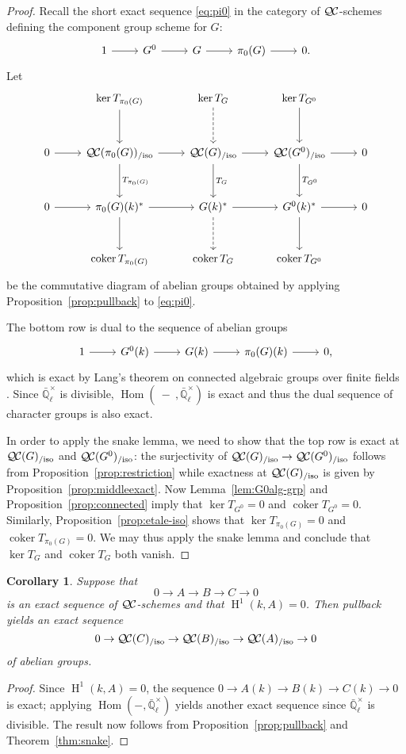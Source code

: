 \documentclass{amsart}
\theoremstyle{plain}
\newtheorem{corollary}[theorem]{Corollary}
\theoremstyle{definition}
\theoremstyle{remark}
\newcommand{\EE}{\mathbb{\bar Q}_\ell}
\newcommand{\Fq}{k}
\newcommand{\EEx}{\EE^\times}
\DeclareMathOperator{\Hom}{Hom}
\DeclareMathOperator{\coker}{coker}
\DeclareMathOperator{\Hh}{H}
\newcommand{\QC}{{\mathcal{Q\hskip-0.8pt C}}}
\newcommand{\QCiso}[1]{\QC(#1)_{/\text{iso}}}
\newcommand{\TrFrob}[1]{T_{#1}}
\begin{document}
\begin{proof}
  Recall the short exact sequence \eqref{eq:pi0} in the category of $\QC$-schemes
  defining the component group scheme for $G$:
  \[
  \begin{tikzcd}
    1 \rar & G^0 \rar & G \rar & \pi_0(G) \rar & 0.
  \end{tikzcd}
  \]
  Let
  \[
  \begin{tikzcd}[row sep=30]
    {}& \ker \TrFrob{\pi_0(G)} \dar & \arrow[dashed]{d} \ker \TrFrob{G} & \ker \TrFrob{G^0} \dar & \\
    0 \rar & \QCiso{\pi_0(G)} \rar \dar{\TrFrob{\pi_0(G)}}
    & \QCiso{G} \rar \dar{\TrFrob{G}} & \QCiso{G^0} \rar \dar{\TrFrob{G^0}} & 0\\
    0 \rar & \pi_0(G)(\Fq)^* \rar \dar
    & \arrow[dashed]{d} G(\Fq)^* \rar & G^0(\Fq)^* \rar \dar & 0\\
    & \coker \TrFrob{\pi_0(G)} & \coker \TrFrob{G} &  \coker \TrFrob{G^0} &
  \end{tikzcd}
  \]
  be the commutative diagram of abelian groups obtained by applying
  Proposition~\ref{prop:pullback} to \eqref{eq:pi0}.

  The bottom row is dual to the sequence of
  abelian groups
  \begin{equation}\label{eq:pi0k}
  \begin{tikzcd}
    1 \rar & G^0(\Fq) \rar & G(\Fq) \rar & \pi_0(G)(\Fq) \rar & 0,
  \end{tikzcd}
  \end{equation}
  which is exact by Lang's theorem on connected algebraic groups over finite fields \cite{lang:56a}.
  Since $\EEx$ is divisible, $\Hom(\ - \ ,\EEx)$ is exact and thus the dual sequence of
  character groups is also exact.

  In order to apply the snake lemma, we need to show that the top row is exact at $\QCiso{G}$ and $\QCiso{G^0}$:
  the surjectivity of $\QCiso{G} \to \QCiso{G^0}$ follows from Proposition~\ref{prop:restriction}
  while exactness at $\QCiso{G}$ is given by Proposition~\ref{prop:middleexact}.
  Now Lemma~\ref{lem:G0alg-grp} and Proposition~\ref{prop:connected}
  imply that $\ker \TrFrob{G^0} =0$ and $\coker \TrFrob{G^0}=0$.
  Similarly, Proposition~\ref{prop:etale-iso} shows that $\ker \TrFrob{\pi_0(G)}=0$
  and $\coker \TrFrob{\pi_0(G)}=0$.
  We may thus apply the snake lemma and conclude that
  $\ker \TrFrob{G}$ and $\coker \TrFrob{G}$ both vanish.
\end{proof}


\begin{corollary}\label{cor:exact}
Suppose that
\[
0 \to A \to B \to C \to 0
\]
is an exact sequence of $\QC$-schemes and that $\Hh^1(\Fq, A) = 0$.
Then pullback yields an exact sequence
\[
0 \to \QCiso{C} \to \QCiso{B} \to \QCiso{A} \to 0
\]
of abelian groups.
\end{corollary}
\begin{proof}
Since $\Hh^1(k, A) = 0$, the sequence $0 \to A(\Fq) \to B(\Fq) \to C(\Fq) \to 0$ is exact;
applying $\Hom(-, \EEx)$ yields another exact sequence since $\EEx$ is divisible.  The result now follows
from Proposition~\ref{prop:pullback} and Theorem~\ref{thm:snake}.
\end{proof}
\end{document}

